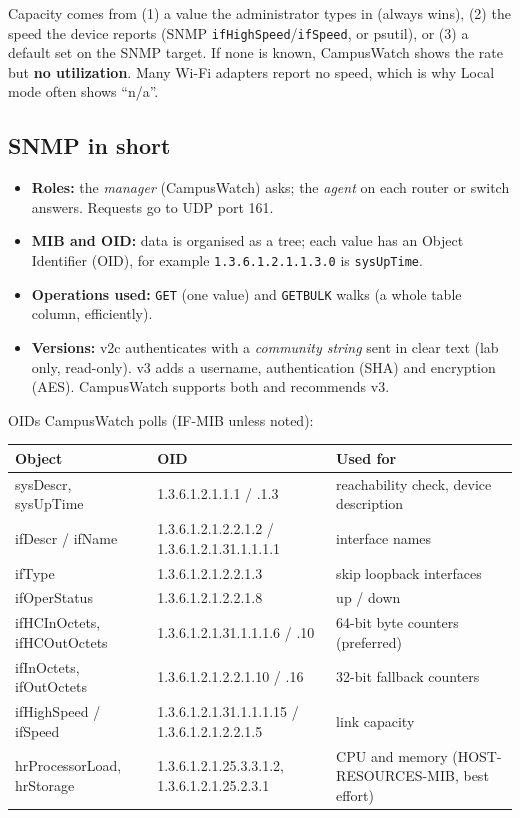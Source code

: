 \documentclass[11pt,a4paper]{article}
\newcommand{\code}[1]{\texttt{#1}}
\begin{document}
Capacity comes from (1) a value the administrator types in (always wins), (2) the speed the device reports
(SNMP \code{ifHighSpeed}/\code{ifSpeed}, or psutil), or (3) a default set on the SNMP target. If none is known, CampusWatch shows
the rate but \textbf{no utilization}. Many Wi-Fi adapters report no speed, which is why Local mode often shows ``n/a''.

\subsection{SNMP in short}

\begin{itemize}
  \item \textbf{Roles:} the \emph{manager} (CampusWatch) asks; the \emph{agent} on each router or switch answers. Requests go to UDP port 161.
  \item \textbf{MIB and OID:} data is organised as a tree; each value has an Object Identifier (OID), for example
        \code{1.3.6.1.2.1.1.3.0} is \code{sysUpTime}.
  \item \textbf{Operations used:} \code{GET} (one value) and \code{GETBULK} walks (a whole table column, efficiently).
  \item \textbf{Versions:} v2c authenticates with a \emph{community string} sent in clear text (lab only, read-only).
        v3 adds a username, authentication (SHA) and encryption (AES). CampusWatch supports both and recommends v3.
\end{itemize}

OIDs CampusWatch polls (IF-MIB unless noted):
\begin{center}
\small
\begin{tabularx}{\linewidth}{@{}l l Y@{}}
\toprule
\textbf{Object} & \textbf{OID} & \textbf{Used for} \\
\midrule
sysDescr, sysUpTime & 1.3.6.1.2.1.1.1 / .1.3 & reachability check, device description \\
ifDescr / ifName & 1.3.6.1.2.1.2.2.1.2 / 1.3.6.1.2.1.31.1.1.1.1 & interface names \\
ifType & 1.3.6.1.2.1.2.2.1.3 & skip loopback interfaces \\
ifOperStatus & 1.3.6.1.2.1.2.2.1.8 & up / down \\
ifHCInOctets, ifHCOutOctets & 1.3.6.1.2.1.31.1.1.1.6 / .10 & 64-bit byte counters (preferred) \\
ifInOctets, ifOutOctets & 1.3.6.1.2.1.2.2.1.10 / .16 & 32-bit fallback counters \\
ifHighSpeed / ifSpeed & 1.3.6.1.2.1.31.1.1.1.15 / 1.3.6.1.2.1.2.2.1.5 & link capacity \\
hrProcessorLoad, hrStorage & 1.3.6.1.2.1.25.3.3.1.2, 1.3.6.1.2.1.25.2.3.1 & CPU and memory (HOST-RESOURCES-MIB, best effort) \\
\bottomrule
\end{tabularx}
\end{center}
\end{document}
